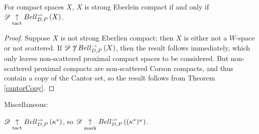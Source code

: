 \documentclass[11pt]{article}
\begin{document}
  \begin{corollary}
    For compact spaces $X$,
    $X$ is strong Eberlein compact if and only if
    $\mathscr{D}\underset{\text{tact}}{\uparrow}Bell_{D,P}^{\rightharpoonup}\left({X}\right)$.
  \end{corollary}

  \begin{proof}
    Suppose $X$ is not strong Eberlien compact; then $X$ is either
    not a $W$-space or not scattered.
    If $\mathscr{D}\not\uparrow Bell_{D,P}^{\rightharpoonup}\left({X}\right)$, then the result follows immediately,
    which only leaves non-scattered proximal compact spaces to be considered.
    But non-scattered proximal compacts are non-scattered Corson compacts,
    and thus contain
    a copy of the Cantor set, so the result follows from Theorem
    \ref{cantorCopy}.
  \end{proof}

  \newpage

  Miscellaneous:

  \begin{example}
    $\mathscr{D}\underset{\text{tact}}{\uparrow} Bell_{D,P}^{\rightharpoonup}\left({\kappa^*}\right)$,
    so $\mathscr{D}\underset{\text{mark}}{\uparrow} Bell_{D,P}^{\rightharpoonup}\left({(\kappa^*)^\omega}\right)$.
  \end{example}






\end{document}
